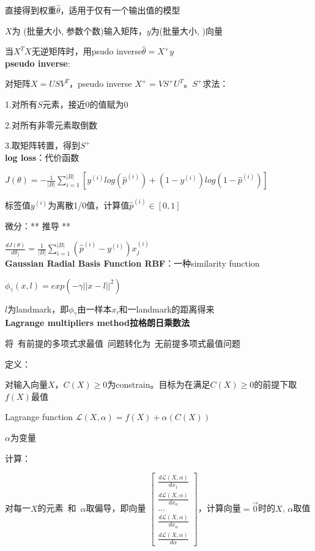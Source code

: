\documentclass[UTF8]{ctexart}
\begin{document}
  直接得到权重$\hat{\theta}$，适用于仅有一个输出值的模型

  $X$为 (批量大小, 参数个数)输入矩阵，$y$为(批量大小, )向量
  
  当$X^TX$无逆矩阵时，用psudo inverse$\hat{\theta} = X^+y$\\
\textbf{pseudo inverse}:

  对矩阵$X=USV^T$，pseudo inverse $X^+=VS^+U^T$。$S^+$求法：

  \quad 1.对所有$S$元素，接近0的值赋为0

  \quad 2.对所有非零元素取倒数

  \quad 3.取矩阵转置，得到$S^+$\\
\textbf{log loss}：代价函数

  $J(\theta) = -\frac{1}{|B|}\sum_{i=1}^{|B|}[y^{(i)}log(\hat{p}^{(i)}) + (1-y^{(i)})log(1-\hat{p}^{(i)})]$

  标签值$y^{(i)}$为离散1/0值，计算值$\hat{p}^{(i)} \in [0,1]$

  微分：** 推导 **
  
  \quad $\frac{d J(\theta)}{d \theta_j} = \frac{1}{|B|}\sum_{i=1}^{|B|}(\hat{p}^{(i)} - y^{(i)}) x_j^{(i)}$\\
\textbf{Gaussian Radial Basis Function RBF}：一种similarity function

  $\phi_{\gamma}(x, l) = exp(-\gamma||x-l||^2)$

  \quad $l$为landmark，即$\phi_{\gamma}$由一样本$x_i$和一landmark的距离得来\\
\textbf{Lagrange multipliers method拉格朗日乘数法}

  将\ 有前提的多项式求最值\ 问题转化为\ 无前提多项式最值问题

  定义：

  \quad 对输入向量$X$，$C(X) \geq 0$为constrain。目标为在满足$C(X) \geq 0$的前提下取$f(X)$最值

  \quad Lagrange function $\mathcal{L} (X, \alpha) = f(X) + \alpha(C(X))$

  \quad \quad $\alpha$为变量

  计算：
  
  \quad 对每一$X$的元素\ 和\ $\alpha$取偏导，即向量
  $\begin{bmatrix}
    \frac{d \mathcal{L}(X, \alpha)}{d x_1}  \\
    \frac{d \mathcal{L}(X, \alpha)}{d x_n} \\
    ... \\
    \frac{d \mathcal{L}(X, \alpha)}{d x_n} \\
    \frac{d \mathcal{L}(X, \alpha)}{d \alpha}
  \end{bmatrix}$，计算向量$=\vec{0} $时的$X$, $\alpha$取值
\end{document}
